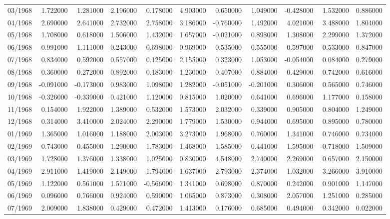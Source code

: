 \begin{tabular}{lrrrrrrrrrr}
03/1968 & 1.722000 & 1.281000 & 2.196000 & 0.178000 & 4.903000 & 0.650000 & 1.049000 & -0.428000 & 1.532000 & 0.886000 \\
04/1968 & 2.690000 & 2.641000 & 2.732000 & 2.758000 & 3.186000 & -0.760000 & 1.492000 & 4.021000 & 3.488000 & 1.804000 \\
05/1968 & 1.708000 & 0.618000 & 1.506000 & 1.432000 & 1.657000 & -0.021000 & 0.898000 & 1.308000 & 2.299000 & 1.372000 \\
06/1968 & 0.991000 & 1.111000 & 0.243000 & 0.698000 & 0.969000 & 0.535000 & 0.555000 & 0.597000 & 0.533000 & 0.847000 \\
07/1968 & 0.834000 & 0.592000 & 0.557000 & 0.125000 & 2.155000 & 0.323000 & 1.053000 & -0.054000 & 0.084000 & 0.279000 \\
08/1968 & 0.360000 & 0.272000 & 0.892000 & 0.183000 & 1.230000 & 0.407000 & 0.884000 & 0.429000 & 0.742000 & 0.616000 \\
09/1968 & -0.091000 & -0.173000 & 0.983000 & 1.098000 & 1.282000 & -0.051000 & -0.201000 & 0.306000 & 0.565000 & 0.746000 \\
10/1968 & -0.326000 & -0.339000 & 0.421000 & 1.120000 & 0.815000 & 1.020000 & 0.641000 & 0.696000 & 1.177000 & 0.158000 \\
11/1968 & 0.154000 & 1.922000 & 1.389000 & 0.532000 & 1.573000 & 2.032000 & 0.339000 & 0.905000 & 0.804000 & 1.249000 \\
12/1968 & 0.314000 & 3.410000 & 2.024000 & 2.290000 & 1.779000 & 1.530000 & 0.944000 & 0.695000 & 0.895000 & 0.780000 \\
01/1969 & 1.365000 & 1.016000 & 1.188000 & 2.003000 & 3.273000 & 1.968000 & 0.760000 & 1.341000 & 0.746000 & 0.734000 \\
02/1969 & 0.743000 & 0.455000 & 1.290000 & 1.783000 & 1.468000 & 1.585000 & 0.441000 & 1.595000 & -0.718000 & 1.509000 \\
03/1969 & 1.728000 & 1.376000 & 1.338000 & 1.025000 & 0.830000 & 4.548000 & 2.740000 & 2.269000 & 0.657000 & 2.150000 \\
04/1969 & 2.911000 & 1.419000 & 2.149000 & -1.794000 & 1.637000 & 2.793000 & 2.374000 & 1.032000 & 3.266000 & 3.910000 \\
05/1969 & 1.122000 & 0.561000 & 1.571000 & -0.566000 & 1.341000 & 0.698000 & 0.870000 & 0.242000 & 0.901000 & 1.147000 \\
06/1969 & 0.096000 & 0.766000 & 0.924000 & 0.590000 & 1.065000 & 0.873000 & 0.308000 & 2.057000 & 1.251000 & 0.285000 \\
07/1969 & 2.009000 & 1.838000 & 0.429000 & 0.472000 & 1.413000 & 0.176000 & 0.685000 & 0.494000 & 0.342000 & 0.022000 \\

\end{tabular}
